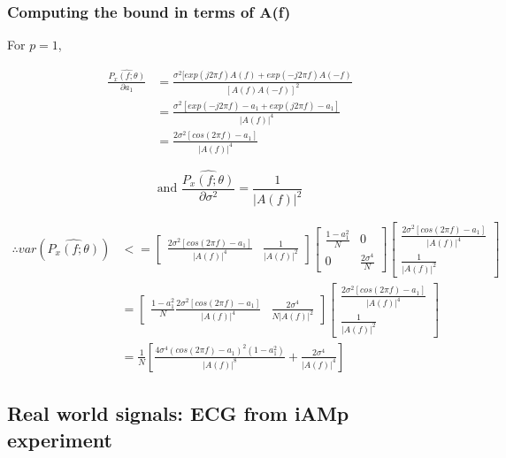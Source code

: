 \documentclass{article}
\begin{document}
\subsubsection{Computing the bound in terms of A(f)}

For $p=1$,

\begin{align}
\frac{\hat{P_x(f;\theta)}}{\partial a_1} &= \frac{\sigma^2 [exp(j2\pi f)A(f) + exp(-j2\pi f)A(-f)}{[A(f)A(-f)]^2} \\
&= \frac{\sigma^2 [exp(-j2\pi f) - a_1 + exp(j2\pi f) - a_1]}{|A(f)|^4} \\
&= \frac{2\sigma^2[cos(2\pi f) - a_1]}{|A(f)|^4}
\end{align}

\begin{equation}
\text{and } \frac{\hat{P_x(f;\theta)}}{\partial \sigma^2} = \frac{1}{|A(f)|^2}
\end{equation}

\begin{align}
\therefore var(\hat{P_x(f;\theta)}) &<=
\begin{bmatrix}
\frac{2\sigma^2[cos(2\pi f) - a_1]}{|A(f)|^4} & \frac{1}{|A(f)|^2}
\end{bmatrix}
\begin{bmatrix}
\frac{1-a_1^2}{N} & 0 \\
0 & \frac{2\sigma^4}{N}
\end{bmatrix}
\begin{bmatrix}
\frac{2\sigma^2[cos(2\pi f) - a_1]}{|A(f)|^4} \\
\frac{1}{|A(f)|^2}
\end{bmatrix}
\\
&=
\begin{bmatrix}
\frac{1-a_1^2}{N} \frac{2\sigma^2[cos(2\pi f) - a_1]}{|A(f)|^4} & \frac{2\sigma^4}{N |A(f)|^2}
\end{bmatrix}
\begin{bmatrix}
\frac{2\sigma^2[cos(2\pi f) - a_1]}{|A(f)|^4} \\
\frac{1}{|A(f)|^2}
\end{bmatrix}
\\
&=\frac{1}{N} [\frac{4\sigma^4 (cos(2\pi f) - a_1)^2(1-a_1^2)}{|A(f)|^8} + \frac{2\sigma^4}{|A(f)|^4}]
\end{align}


\pagebreak

\subsection{Real world signals: ECG from iAMp experiment}
\end{document}
